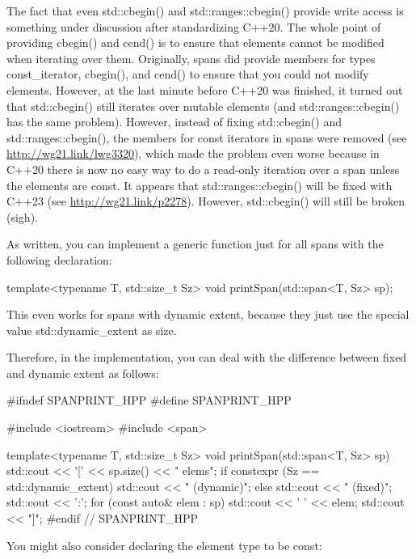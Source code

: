 The fact that even std::cbegin() and std::ranges::cbegin() provide write access is something under discussion after standardizing C++20. The whole point of providing cbegin() and cend() is to ensure that elements cannot be modified when iterating over them. Originally, spans did provide members for types const\_iterator, cbegin(), and cend() to ensure that you could not modify elements. However, at the last minute before C++20 was finished, it turned out that std::cbegin() still iterates over mutable elements (and std::ranges::cbegin() has the same problem). However, instead of fixing std::cbegin() and std::ranges::cbegin(), the members for const iterators in spans were removed (see \url{http://wg21.link/lwg3320}), which made the problem even worse because in C++20 there is now no easy way to do a read-only iteration over a span unless the elements are const. It appears that std::ranges::cbegin() will be fixed with C++23 (see \url{http://wg21.link/p2278}). However, std::cbegin() will still be broken (sigh).


As written, you can implement a generic function just for all spans with the following declaration:

\begin{cpp}
template<typename T, std::size_t Sz>
void printSpan(std::span<T, Sz> sp);
\end{cpp}

This even works for spans with dynamic extent, because they just use the special value std::dynamic\_extent as size.

Therefore, in the implementation, you can deal with the difference between fixed and dynamic extent as follows:


\begin{cpp}
#ifndef SPANPRINT_HPP
#define SPANPRINT_HPP

#include <iostream>
#include <span>

template<typename T, std::size_t Sz>
void printSpan(std::span<T, Sz> sp)
{
	std::cout << '[' << sp.size() << " elems";
	if constexpr (Sz == std::dynamic_extent) {
		std::cout << " (dynamic)";
	}
	else {
		std::cout << " (fixed)";
	}
	std::cout << ':';
	for (const auto& elem : sp) {
		std::cout << ' ' << elem;
	}
	std::cout << "]\n";
	} 
#endif // SPANPRINT_HPP
\end{cpp}

You might also consider declaring the element type to be const:


